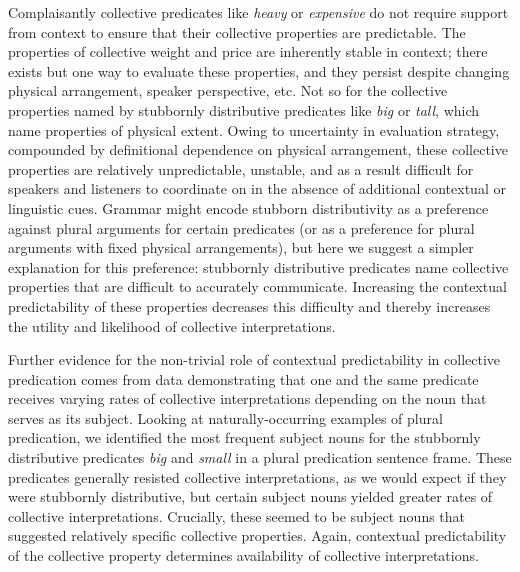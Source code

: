 \documentclass[preprint,12pt,authoryear,titlepage]{elsarticle}
\begin{document}
Complaisantly collective predicates like \emph{heavy} or \emph{expensive} do not require support from context to ensure that their collective properties are predictable. The properties of collective weight and price are inherently stable in context; there exists but one way to evaluate these properties, and they persist despite changing physical arrangement, speaker perspective, etc. Not so for the collective properties named by stubbornly distributive predicates like \emph{big} or \emph{tall}, which name properties of physical extent. Owing to uncertainty in evaluation strategy, compounded by definitional dependence on physical arrangement, these collective properties are relatively unpredictable, unstable, and as a result difficult for speakers and listeners to coordinate on in the absence of additional contextual or linguistic cues. Grammar might encode stubborn distributivity as a preference against plural arguments for certain predicates (or as a preference for plural arguments with fixed physical arrangements), but here we suggest a simpler explanation for this preference: stubbornly distributive predicates name collective properties that are difficult to accurately communicate. Increasing the contextual predictability of these properties decreases this difficulty and thereby increases the utility and likelihood of collective interpretations.

Further evidence for the non-trivial role of contextual predictability in collective predication comes from data demonstrating that one and the same predicate receives varying rates of collective interpretations depending on the noun that serves as its subject. Looking at naturally-occurring examples of plural predication, we identified the most frequent subject nouns for the stubbornly distributive predicates \emph{big} and \emph{small} in a plural predication sentence frame. These predicates generally resisted collective interpretations, as we would expect if they were stubbornly distributive, but certain subject nouns yielded greater rates of collective interpretations. Crucially, these seemed to be subject nouns that suggested relatively specific collective properties. 
Again, contextual predictability of the collective property determines availability of collective interpretations.
\end{document}
